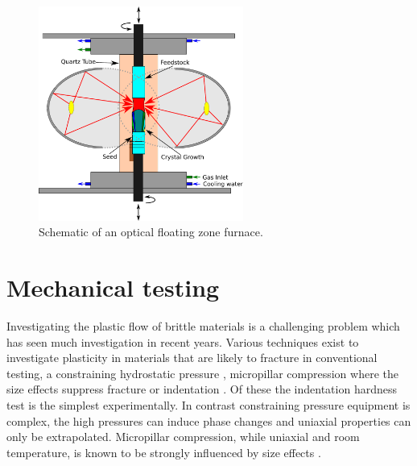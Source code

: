 \begin{figure}
\centering
\includegraphics[width=0.6\textwidth]{Image_Furnace_Schematic}
\caption{Schematic of an optical floating zone furnace.\label{fig:OFZF_schematic}}
\end{figure}














\section{Mechanical testing}
\label{sec:Ti2Ni_mechtesting}

Investigating the plastic flow of brittle materials is a challenging problem which has seen much investigation in recent years. Various techniques exist to investigate plasticity in materials that are likely to fracture in conventional testing, a constraining hydrostatic pressure \cite{Griggs1936,Weinrich1975,Borvin1990}, micropillar compression where the size effects suppress fracture \cite{Uchic2004} or indentation \cite{Cripps2011,tabor2000hardness,Marsh1964,Korte2009}. Of these the indentation hardness test is the simplest experimentally. In contrast constraining pressure equipment is complex, the high pressures can induce phase changes and uniaxial properties can only be extrapolated. Micropillar compression, while uniaxial and room temperature, is known to be strongly influenced by size effects \cite{Uchic2004,Greer2005,Greer2006corrigendum}.


